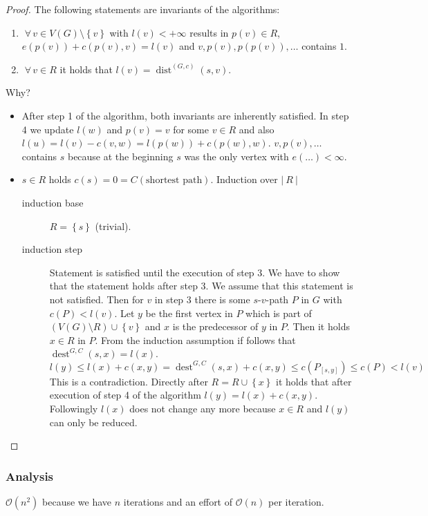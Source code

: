 \documentclass{article}
\newcommand{\card}[1]{\left|\:\!#1\:\!\right|}
\newcommand{\set}[1]{\left\{#1\right\}}
\newcommand{\gath}[2]{$#1$-$#2$-path} %
\newcommand{\fall}{\;\forall\,}
\begin{document}
\begin{proof}
  The following statements are invariants of the algorithms:
  \begin{enumerate}
    \item $\fall v \in V(G) \setminus \set{v}$ with $l(v) < +\infty$ results in $p(v) \in R$, $e(p(v)) + c(p(v), v) = l(v)$ and $v, p(v), p(p(v)), \ldots$ contains $1$.
    \item $\fall v \in R$ it holds that $l(v) = \operatorname{dist}^{(G,c)}(s, v)$.
  \end{enumerate}
  Why?
  \begin{itemize}
    \item
      After step 1 of the algorithm, both invariants are inherently satisfied.
      In step 4 we update $l(w)$ and $p(v) = v$ for some $v \in R$ and also $l(u) = l(v) - c(v, w) = l(p(w)) + c(p(w), w)$. $v, p(v), \ldots$ contains $s$ because at the beginning $s$ was the only vertex with $e(\dots) < \infty$.
    \item
      $s \in R$ holds $c(s) = 0 = C(\text{shortest path})$.
      Induction over $\card{R}$
      \begin{description}
        \item[induction base] $R = \set{s}$ (trivial).
        \item[induction step] Statement is satisfied until the execution of step 3. We have to show that the statement holds after step 3. We assume that this statement is not satisfied. Then for $v$ in step 3 there is some \gath sv $P$ in $G$ with $c(P) < l(v)$. Let $y$ be the first vertex in $P$ which is part of $(V(G) \setminus R) \cup \set{v}$ and $x$ is the predecessor of $y$ in $P$.
        Then it holds $x \in R$ in $P$. From the induction assumption if follows that $\operatorname{dest}^{G,C}(s,x) = l(x)$.
        \[
          l(y) \leq l(x) + c(x, y) = \operatorname{dest}^{G,C}(s, x) + c(x,y) \leq c(P_{[s,y]}) \leq c(P) < l(v)
        \]
        This is a contradiction.
        Directly after $R = R \cup \set{x}$ it holds that after execution of step 4 of the algorithm $l(y) = l(x) + c(x, y)$. Followingly $l(x)$ does not change any more because $x \in R$ and $l(y)$ can only be reduced.
      \end{description}
  \end{itemize}
\end{proof}

\subsubsection{Analysis}
%
$\mathcal{O}(n^2)$ because we have $n$ iterations and an effort of $\mathcal{O}(n)$ per iteration.
\end{document}
